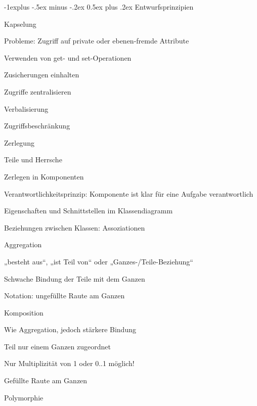 \documentclass[a4paper]{article}
\makeatletter
\renewcommand{\subsection}{\@startsection{subsection}{2}{0mm}%
                                {-1explus -.5ex minus -.2ex}%
                                {0.5ex plus .2ex}%
                                {\normalfont\normalsize\bfseries}}
\makeatother
\begin{document}
\begin{multicols}{3}
  \subsection{Entwurfsprinzipien}
  \begin{itemize*}
    \item Kapselung
    \begin{itemize*}
      \item Probleme: Zugriff auf private oder ebenen-fremde Attribute
      \item Verwenden von get- und set-Operationen
      \item Zusicherungen einhalten
      \item Zugriffe zentralisieren
      \item Verbalisierung
      \item Zugriffsbeschränkung
    \end{itemize*}
    \item Zerlegung
    \begin{itemize*}
      \item Teile und Herrsche
      \item Zerlegen in Komponenten
      \item Verantwortlichkeitsprinzip: Komponente ist klar für eine Aufgabe verantwortlich
      \item Eigenschaften und Schnittstellen im Klassendiagramm
      \item Beziehungen zwischen Klassen: Assoziationen
      \item Aggregation
      \begin{itemize*}
        \item „besteht aus“, „ist Teil von“ oder „Ganzes-/Teile-Beziehung“
        \item Schwache Bindung der Teile mit dem Ganzen
        \item Notation: ungefüllte Raute am Ganzen
      \end{itemize*}
      \item Komposition
      \begin{itemize*}
        \item Wie Aggregation, jedoch stärkere Bindung
        \item Teil nur einem Ganzen zugeordnet
        \item Nur Multiplizität von 1 oder 0..1 möglich!
        \item Gefüllte Raute am Ganzen
      \end{itemize*}
      \item Polymorphie

\end{itemize*}
\end{itemize*}
\end{multicols}
\end{document}
